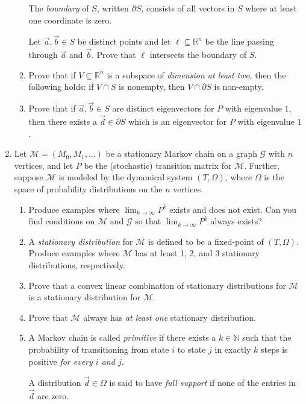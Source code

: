 \documentclass[letter]{article}
\newcommand{\R}{\mathbb{R}}
\newcommand{\N}{\mathbb{N}}
\begin{document}
\begin{enumerate}
\begin{enumerate}
				The \emph{boundary} of $S$, written $\partial S$, consists of all vectors in $S$ where at least one coordinate
				is zero.

				Let $\vec a,\vec b\in S$ be distinct points and let $\ell\subseteq \R^n$ be the line passing through $\vec a$
				and $\vec b$. Prove that $\ell$ intersects the boundary of $S$.
			\item Prove that if $V\subseteq \R^n$ is a subspace of \emph{dimension at
				least two}, then the following holds: if $V\cap S$ is nonempty, then $V\cap \partial S$ is non-empty.
			\item Prove that if $\vec a,\vec b\in S$ are distinct eigenvectors for $P$ with eigenvalue $1$, then there
				exists a $\vec d\in \partial S$ which is an eigenvector for $P$ with eigenvalue $1$.
		\end{enumerate}

		\item Let $\mathcal M=(M_0,M_1,\ldots)$ be a stationary Markov chain on a graph $\mathcal G$
			with $n$ vertices, and let $P$ be the (stochastic) transition matrix for $\mathcal M$. 
			Further, suppose $\mathcal M$ is modeled by the dynamical system $(T,\Omega)$,
			where $\Omega$ is the space of probability distributions on the $n$ vertices.
		\begin{enumerate}
			\item Produce examples where $\lim_{k\to\infty} P^k$ exists and does not exist. Can you find
				conditions on $\mathcal M$ and $\mathcal G$ so that $\lim_{k\to\infty} P^k$ always exists?
			\item A \emph{stationary distribution} for $\mathcal M$ is defined to be a fixed-point of 
				$(T,\Omega)$. Produce examples where $\mathcal M$ has at least 1, 2, and 3 stationary distributions, respectively.

			\item Prove that a convex linear combination of stationary distributions for $\mathcal M$ 
				is a stationary distribution for $\mathcal M$.

			\item Prove that $\mathcal M$ always has \emph{at least one} stationary distribution.

			\item A Markov chain is called \emph{primitive} if there exists a $k\in \N$ such that
				the probability of transitioning from state $i$ to state $j$ in exactly $k$ steps
				is positive \emph{for every $i$ and $j$}.

				\smallskip
				A distribution $\vec d\in \Omega$ is said to have \emph{full support} if none of the entries
				in $\vec d$ are zero.


\end{enumerate}
\end{enumerate}
\end{document}

